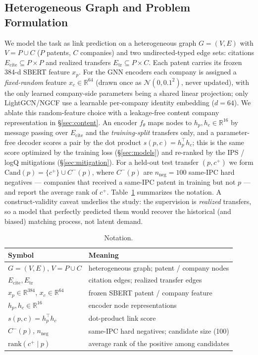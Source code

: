 \documentclass[preprint,12pt]{elsarticle}
\begin{document}
\subsection{Heterogeneous Graph and Problem Formulation}
We model the task as link prediction on a heterogeneous graph $G=(V,E)$ with
$V=P\cup C$ ($P$ patents, $C$ companies) and two undirected-typed edge sets:
citations $E_{\mathrm{cite}}\subseteq P\times P$ and realized transfers
$E_{\mathrm{tr}}\subseteq P\times C$. Each patent carries its frozen 384-d SBERT
feature $x_p$. For the GNN encoders each company is assigned a \emph{fixed-random}
feature $x_c\in\mathbb{R}^{64}$ (drawn once as $\mathcal{N}(0,0.1^2)$, never updated),
with the only learned company-side parameters being a shared linear projection; only
LightGCN/NGCF use a learnable per-company identity embedding ($d=64$). We ablate this
random-feature choice with a leakage-free content company representation in
\S\ref{sec:content}. An encoder
$f_\theta$ maps nodes to $h_p,h_c\in\mathbb{R}^{16}$ by message passing over
$E_{\mathrm{cite}}$ and the \emph{training-split} transfers only, and a parameter-free
decoder scores a pair by the dot product $s(p,c)=h_p^{\top}h_c$; this is the same
score optimized by the training loss (\S\ref{sec:models}) and re-ranked by the
IPS / logQ mitigations (\S\ref{sec:mitigation}). For a held-out test transfer
$(p,c^{+})$ we form $\mathrm{Cand}(p)=\{c^{+}\}\cup C^{-}(p)$, where $C^{-}(p)$ are
$n_{\mathrm{neg}}=100$ same-IPC hard negatives --- companies that received a same-IPC
patent in training but not $p$ --- and report the average rank of $c^{+}$.
Table~\ref{tab:notation} summarizes the notation. A construct-validity caveat
underlies the study: the supervision is \emph{realized} transfers, so a model that
perfectly predicted them would recover the historical (and biased) matching process,
not latent demand.

\begin{table}[t]
\centering
\caption{Notation.}
\label{tab:notation}
\begin{tabular}{ll}
\toprule
Symbol & Meaning \\
\midrule
$G=(V,E)$, $V=P\cup C$ & heterogeneous graph; patent / company nodes \\
$E_{\mathrm{cite}}, E_{\mathrm{tr}}$ & citation edges; realized transfer edges \\
$x_p\in\mathbb{R}^{384}$, $x_c\in\mathbb{R}^{64}$ & frozen SBERT patent / company feature \\
$h_p,h_c\in\mathbb{R}^{16}$ & encoder node representations \\
$s(p,c)=h_p^{\top}h_c$ & dot-product link score \\
$C^{-}(p)$, $n_{\mathrm{neg}}$ & same-IPC hard negatives; candidate size (100) \\
$\mathrm{rank}(c^{+}\mid p)$ & average rank of the positive among candidates \\
\bottomrule
\end{tabular}
\end{table}
\end{document}
